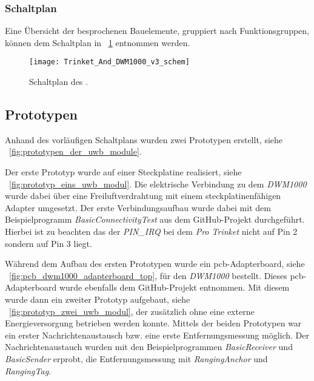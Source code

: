 %
%
\subsubsection{Schaltplan} \label{subsec:schaltplan_uwb_modul}

Eine Übersicht der besprochenen Bauelemente, gruppiert nach Funktionsgruppen, können dem Schaltplan in \figurename~\ref{fig:schaltplan_uwb_modul} entnommen werden.

\begin{figure}
	\texttt{[image: Trinket\_And\_DWM1000\_v3\_schem]}
	\caption{Schaltplan des .}
	\label{fig:schaltplan_uwb_modul}
\end{figure}


%
%
\subsection{Prototypen}

Anhand des vorläufigen Schaltplans wurden zwei Prototypen erstellt, siehe \figurename~\ref{fig:prototypen_der_uwb_module}.

Der erste Prototyp wurde auf einer Steckplatine realisiert, siehe \figurename~\ref{fig:prototyp_eins_uwb_modul}. Die elektrische Verbindung zu dem \textit{DWM1000} wurde dabei über eine Freiluftverdrahtung mit einem steckplatinenfähigen Adapter umgesetzt. Der erste Verbindungsaufbau wurde dabei mit dem Beispielprogramm \textit{BasicConnectivityTest} aus dem GitHub-Projekt \cite{Trojer2015} durchgeführt. Hierbei ist zu beachten das der \textit{PIN\_IRQ} bei dem \textit{Pro Trinket} nicht auf Pin 2 sondern auf Pin 3 liegt.

Während dem Aufbau des ersten Prototypen wurde ein \Gls{pcb}-Adap\-ter\-board, siehe \figurename~\ref{fig:pcb_dwm1000_adapterboard_top}, für den \textit{DWM1000} bestellt. Dieses \gls{pcb}-Adapterboard wurde ebenfalls dem GitHub-Projekt \cite{Trojer2015} entnommen. Mit diesem wurde dann ein zweiter Prototyp aufgebaut, siehe \figurename~\ref{fig:prototyp_zwei_uwb_modul}, der zusätzlich ohne eine externe Energieversorgung betrieben werden konnte. Mittels der beiden Prototypen war ein erster Nachrichtenaustausch bzw. eine erste Entfernungsmessung möglich. Der Nachrichtenaustauch wurden mit den Beispielprogrammen \textit{BasicReceiver} und \textit{BasicSender} erprobt, die Entfernungsmessung mit \textit{RangingAnchor} und \textit{RangingTag}.

